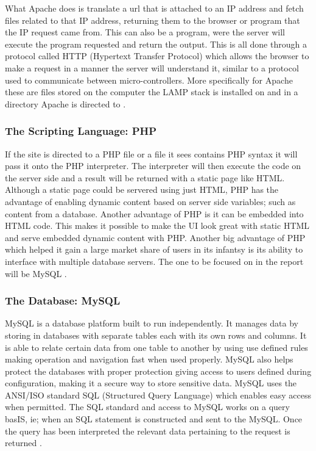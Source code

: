 \documentclass[a4paper,11pt]{article}
\numberwithin{figure}{section}
\numberwithin{table}{section}
\begin{document}
What Apache does is translate a url that is attached to an IP address and fetch files related to that IP address, returning them to the browser or program that the IP request came from. This can also be a program, were the server will execute the program requested and return the output. This is all done through a protocol called HTTP (Hypertext Transfer Protocol) which allows the browser to make a request in a manner the server will understand it, similar to a protocol used to communicate between micro-controllers. More specifically for Apache these are files stored on the computer the LAMP stack is installed on and in a directory Apache is directed to \cite{apachebook1,apachebook2}.  


\subsubsection{The Scripting Language: PHP}
If the site is directed to a PHP file or a file it sees contains PHP syntax it will pass it onto the PHP interpreter. The interpreter will then execute the code on the server side and a result will be returned with a static page like HTML. Although a static page could be servered using just HTML, PHP has the advantage of enabling dynamic content based on server side variables; such as content from a database. Another advantage of PHP is it can be embedded into HTML code. This makes it possible to make the UI look great with static HTML and serve embedded dynamic content with PHP. Another big advantage of PHP which helped it gain a large market share of users in its infantsy is its ability to interface with multiple database servers. The one to be focused on in the report will be MySQL \cite{PHP}.


\subsubsection{The Database: MySQL}
MySQL is a database platform built to run independently. It manages data by storing in databases with separate tables each with its own rows and columns. It is able to relate certain data from one table to another by using use defined rules making operation and navigation fast when used properly. MySQL also helps protect the databases with proper protection giving access to users defined during configuration, making it a secure way to store sensitive data. MySQL uses the ANSI/ISO standard SQL (Structured Query Language) which enables easy access when permitted. The SQL standard and access to MySQL works on a query basIS, ie; when an SQL statement is constructed and sent to the MySQL. Once the query has been interpreted the relevant data pertaining to the request is returned \cite{mysql}.  
\end{document}

